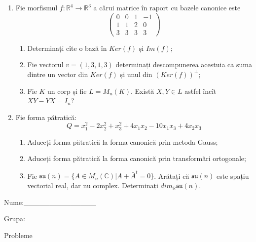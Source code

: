 \documentclass{article}
\begin{document}
\begin{enumerate}
 \item Fie morfismul $f:\mathbb{R}^4 \to \mathbb{R}^3$ a cărui matrice în raport cu bazele canonice este
$$\begin{pmatrix}
0&0&1&-1\\
1&1&2&0\\
3&3&3&3
\end{pmatrix}$$

\begin{enumerate}
\item Determinați cîte o bază în $Ker(f)$ și $Im(f)$;
\item Fie vectorul $v=(1,3,1,3)$ determinați descompunerea acestuia ca suma dintre un vector din $Ker(f)$ și unul din $(Ker(f))^\perp$;
\item Fie $K$ un corp și fie $L=M_n(K)$. Există $X,Y \in L$ astfel încît $XY-YX=I_n$?  
\end{enumerate}
\item Fie forma pătratică:
$$Q= x_1^2-2x_2^2+x_3^2+4x_1x_2-10x_1x_3+4x_2x_3$$

\begin{enumerate}
\item Aduceți forma pătratică la forma canonică prin metoda Gauss;
\item Aduceți forma pătratică la forma canonică prin transformări ortogonale;
\item Fie $\mathfrak{su}(n)=\{ A \in M_n(\mathbb{C}) | A+\bar{A}^t=0\}$. Arătați că $\mathfrak{su}(n)$ este spațiu vectorial real, dar nu complex.
Determinați $dim_{\mathbb{R}}\mathfrak{su}(n)$.
\end{enumerate}
\end{enumerate}
\newpage
\begin{flushright}
Nume:\_\_\_\_\_\_\_\_\_\_\_\_\_\_
 
 
Grupa:\_\_\_\_\_\_\_\_\_\_\_\_\_\_
\end{flushright}
\begin{center}
\vspace{2cm}
{\Large Probleme}
\vspace{2cm}
\end{center}
\end{document}
